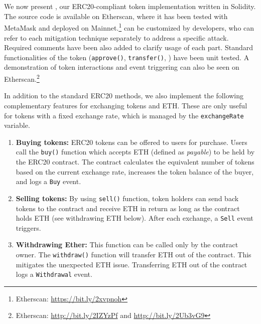 
\section{\sys}\label{sec:proposal}

We now present \sys, our ERC20-compliant token implementation written in Solidity. The source code is available on Etherscan, where it has been tested with MetaMask and deployed on Mainnet.\footnote{Etherscan: \url{https://bit.ly/2xvpnoh}} \sys can be customized by developers, who can refer to each mitigation technique separately to address a specific attack. Required comments have been also added to clarify usage of each part. Standard functionalities of the token (\ie \texttt{approve()}, \texttt{transfer()}, \etc) have been unit tested. A demonstration of token interactions and event triggering can also be seen on Etherscan.\footnote{Etherscan: \url{http://bit.ly/2IZYzPf} and \url{http://bit.ly/2Ub3vG9}} 


In addition to the standard ERC20 methods, we also implement the following complementary features for exchanging tokens and ETH. These are only useful for tokens with a fixed exchange rate, which is managed by the \texttt{exchangeRate} variable.  

\begin{enumerate}
	\item \textbf{Buying tokens:} ERC20 tokens can be offered to users for purchase. Users call the \texttt{buy()} function which accepts ETH (\ie defined as \textit{payable}) to be held by the ERC20 contract. The contract calculates the equivalent number of tokens based on the current exchange rate, increases the token balance of the buyer, and logs a \texttt{Buy} event.
	\item \textbf{Selling tokens:} By using \texttt{sell()} function, token holders can send back tokens to the contract and receive ETH in return as long as the contract holds ETH (see withdrawing ETH below). After each exchange, a \texttt{Sell} event triggers. 
	\item \textbf{Withdrawing Ether:} This function can be called only by the contract owner. The \texttt{withdraw()} function will transfer ETH out of the contract. This mitigates the unexpected ETH issue. Transferring ETH out of the contract logs a \texttt{Withdrawal} event.
\end{enumerate}

